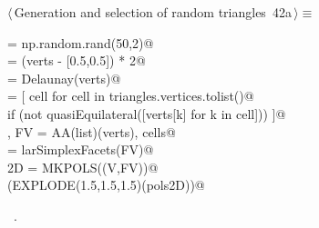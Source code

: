 \documentclass[11pt,oneside]{article}	%
\begin{document}
\begin{flushleft} \small \label{scrap89}
\protect{}$\langle\,$Generation and selection of random triangles\nobreak\ {\footnotesize 42a}$\,\rangle\equiv$
\vspace{-1ex}
\begin{list}{}{} \item
\mbox{}\verb@verts = np.random.rand(50,2)@\\
\mbox{}\verb@verts = (verts - [0.5,0.5]) * 2@\\
\mbox{}\verb@triangles = Delaunay(verts)@\\
\mbox{}\verb@cells = [ cell for cell in triangles.vertices.tolist()@\\
\mbox{}\verb@         if (not quasiEquilateral([verts[k] for k in cell])) ]@\\
\mbox{}\verb@V, FV = AA(list)(verts), cells@\\
\mbox{}\verb@EV = larSimplexFacets(FV)@\\
\mbox{}\verb@pols2D = MKPOLS((V,FV))@\\
\mbox{}\verb@VIEW(EXPLODE(1.5,1.5,1.5)(pols2D))@\\
\mbox{}\verb@@{\NWsep}
\end{list}
\vspace{-1ex}
\footnotesize\addtolength{\baselineskip}{-1ex}
\begin{list}{}{\setlength{\itemsep}{-\parsep}\setlength{\itemindent}{-\leftmargin}}
\item \NWtxtMacroRefIn\ .
\end{list}
\end{flushleft}
\end{document}

